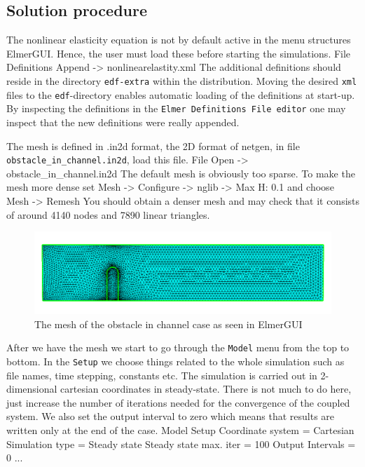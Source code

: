 \subsection*{Solution procedure}


The nonlinear elasticity equation is not by default active in the menu structures ElmerGUI. 
Hence, the user must load these before starting the simulations.
\ttbegin
File 
  Definitions
    Append -> nonlinearelastity.xml
\ttend
The additional definitions should reside in the directory \texttt{edf-extra} within the distribution.
Moving the desired \texttt{xml} files to the \texttt{edf}-directory enables automatic loading of the 
definitions at start-up. By inspecting the definitions in the \texttt{Elmer Definitions File editor} one
may inspect that the new definitions were really appended. 


The mesh is defined in .in2d format, the 2D format of 
netgen, in file \texttt{obstacle\_in\_channel.in2d}, load this file.
\ttbegin
File 
  Open -> obstacle\_in\_channel.in2d
\ttend
The default mesh is obviously too sparse. To make the mesh 
more dense set
\ttbegin
Mesh -> Configure -> nglib -> Max H: 0.1 
\ttend
and choose
\ttbegin
Mesh -> Remesh 
\ttend
You should obtain a denser mesh and may check that it consists 
of around 4140 nodes and 7890 linear triangles.

\begin{figure}[h]
\centering
\includegraphics[width=12cm]{fsi_obstacle_gui}
\caption{The mesh of the obstacle in channel case as seen in ElmerGUI}\label{fg:obstacle_in_channel_mesh}
\end{figure} 


After we have the mesh we start to go through the \texttt{Model} menu from the top to bottom. 
In the \texttt{Setup} we choose things related to the whole simulation such as file names, 
time stepping, constants etc.
The simulation is carried out in 2-dimensional cartesian
coordinates in steady-state. There is not much to do here, just increase the number of iterations needed 
for the convergence of the coupled system. We also set the output interval to zero which means that results are 
written only at the end of the case.
\ttbegin
Model
  Setup 
    Coordinate system = Cartesian
    Simulation type = Steady state
    Steady state max. iter = 100
    Output Intervals = 0
    ...
\ttend

